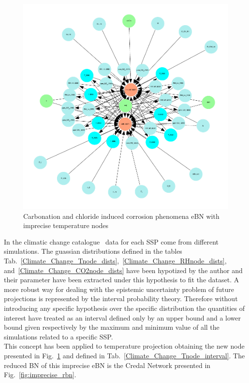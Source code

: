 \begin{figure}[H]
    \centering
    \includegraphics[width=\linewidth]{imgs/pdfs/14_total_ebn_imprecise.pdf}
    \caption{Carbonation and chloride induced corrosion phenomena eBN with imprecise temperature nodes}\label{fig:imprecise_ebn}
\end{figure}

In the climatic change catalogue~\cite{Copernicus_Climate_Change} data for each SSP come from different simulations. The guassian distributions defined in the tables Tab.~\ref{Climate_Change_Tnode_dists},~\ref{Climate_Change_RHnode_dists}, and~\ref{Climate_Change_CO2node_dists} have been hypotized by the author and their parameter have been extracted under this hypothesis to fit the dataset.
A more robust way for dealing with the epistemic uncertainty problem of future projections is represented by the interval probability theory. Therefore without introducing any specific hypothesis over the specific distribution the quantities of interest have treated as an interval defined only by an upper bound and a lower bound given respectively by the maximum and minimum value of all the simulations related to a specific SSP.\\
This concept has been applied to temperature projection obtaining the new node presented in Fig.~\ref{fig:imprecise_ebn} and defined in Tab.~\ref{Climate_Change_Tnode_interval}. The reduced BN of this imprecise eBN is the Credal Network presented in Fig.~\ref{fig:imprecise_rbn}.


